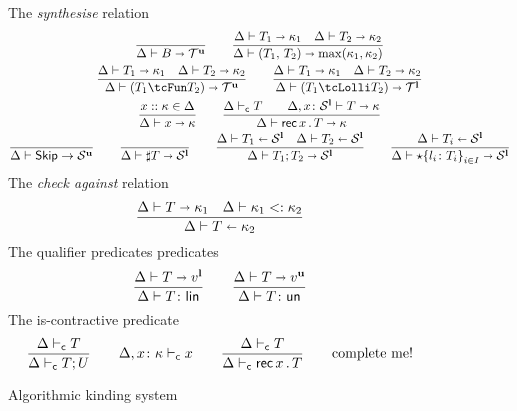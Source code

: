 \begin{figure}[h!]
  The \emph{synthesise} relation \hfill{}
  \begin{gather*}
    \frac{}{\algkindout{\tcBase}{\kindt^\Un}}
    \qquad 
    \frac{
      \algkindout{T_1}{\kind_1}
      \quad
      \algkindout{T_2}{\kind_2}
    }{
      \algkindout{\tPair{T_1}{T_2}}{\max(\kind_1, \kind_2)}
    }
    \\
    \frac{
      \algkindout{T_1}{\kind_1}
      \quad
      \algkindout{T_2}{\kind_2}
    }{
      \algkindout{(\tUnFun{T_1}{T_2})}{\kindt^\Un}
      }
    \qquad
    \frac{
      \algkindout{T_1}{\kind_1}
      \quad
      \algkindout{T_2}{\kind_2}
    }{
      \algkindout{(\tLinFun{T_1}{T_2})}{\kindt^\Lin}
    }
    \\
    \frac{x :: \kind \in \kindEnv}{\algkindout x \kind}
   \qquad
   \frac{
     \contractive T
     \qquad
     \algkindout[\kindEnv, x\colon \kinds^\Lin] T \kind
   }{
     \algkindout{\tRec xT}{\kind}
   }
    \\
    \frac{}{\kindEnv \Alg \tskip \rightarrow \kinds^\Un}
    \qquad 
    \frac{}{\algkindout{\tMsg T}{\kinds^\Lin}}
    \qquad
    \frac{
      \algkindin{T_1}{\kinds^\Lin}
      \quad
      \algkindin{T_2}{\kinds^\Lin}
    }{
      \algkindout{\tSemi{T_1}{T_2}}{\kinds^\Lin}
    }
    \qquad
    \frac{
      \algkindin{T_i}{\kinds^\Lin}
    }{
      \algkindout{\tChoice{\{l_i\colon T_i\}}_{i\in I}}{\kinds^\Lin}
    }
  \end{gather*}
  The \emph{check against} relation\hfill{}
  \begin{equation*}
    \frac{
      \algkindout{T}{\kind_1}
      \quad
      \subkind{\kind_1}{\kind_2}
    }{
      \algkindin T {\kind_2}
    }
  \end{equation*}
  The qualifier predicates predicates  \hfill{}
  \begin{equation*}
    \frac{
      \algkindout T {v^\Lin}
    }{
      \isLin T
    }
    \qquad
    \frac{
      \algkindout T {v^\Un}
    }{
      \isUn T
    }
  \end{equation*}
  The is-contractive predicate  \hfill{}\quad{}
  \begin{equation*}
    \frac{
      \contractive{T}
    }{
      \contractive{T;U}
    }
    \qquad
    \contractive[\kindEnv,x\colon\kind]{x}
    \qquad 
    \frac{
      \contractive{T}
    }{
      \contractive{\tRecK xT}
    }
    \qquad
    \text{complete me!}
  \end{equation*}
  \caption{Algorithmic kinding system}
  \label{fig:kinding-system}
\end{figure}


